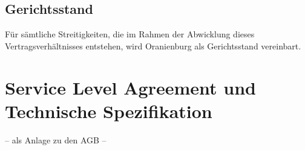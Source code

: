 \documentclass{terms}
\begin{document}
\subsection{Gerichtsstand}
Für sämtliche Streitigkeiten, die im Rahmen der Abwicklung dieses Vertragsverhältnisses entstehen, wird Oranienburg als Gerichtsstand vereinbart.

\newpage
\section{Service Level Agreement und Technische Spezifikation}
\vspace*{-3mm}
\begin{center}– als Anlage zu den AGB –\end{center}
\vspace*{-3mm}
\end{document}

